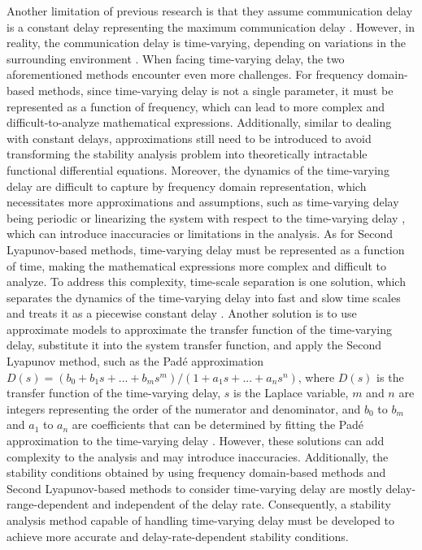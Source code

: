 \documentclass[journal]{IEEEtran}
\begin{document}
Another limitation of previous research is that they assume communication delay is a constant delay representing the maximum communication delay \citep{feyzmahdavian2012optimal,liu2001effects}. However, in reality, the communication delay is time-varying, depending on variations in the surrounding environment \citep{yang2021time,fiengo2019distributed}. When facing time-varying delay, the two aforementioned methods encounter even more challenges. For frequency domain-based methods, since time-varying delay is not a single parameter, it must be represented as a function of frequency, which can lead to more complex and difficult-to-analyze mathematical expressions. Additionally, similar to dealing with constant delays, approximations still need to be introduced to avoid transforming the stability analysis problem into theoretically intractable functional differential equations. Moreover, the dynamics of the time-varying delay are difficult to capture by frequency domain representation, which necessitates more approximations and assumptions, such as time-varying delay being periodic \citep{louarroudi2014frequency} or linearizing the system with respect to the time-varying delay \citep{otto2016frequency}, which can introduce inaccuracies or limitations in the analysis. As for Second Lyapunov-based methods, time-varying delay must be represented as a function of time, making the mathematical expressions more complex and difficult to analyze. To address this complexity, time-scale separation is one solution, which separates the dynamics of the time-varying delay into fast and slow time scales and treats it as a piecewise constant delay \citep{reiner1996flight}. Another solution is to use approximate models to approximate the transfer function of the time-varying delay, substitute it into the system transfer function, and apply the Second Lyapunov method, such as the Padé approximation $D(s) = (b_0 + b_1 s + ... + b_m s^m)/(1 + a_1 s + ... + a_n s^n)$, where $D(s)$ is the transfer function of the time-varying delay, $s$ is the Laplace variable, $m$ and $n$ are integers representing the order of the numerator and denominator, and $b_0$ to $b_m$ and $a_1$ to $a_n$ are coefficients that can be determined by fitting the Padé approximation to the time-varying delay \citep{shah2004modeling}. However, these solutions can add complexity to the analysis and may introduce inaccuracies. Additionally, the stability conditions obtained by using frequency domain-based methods and Second Lyapunov-based methods to consider time-varying delay are mostly delay-range-dependent and independent of the delay rate. Consequently, a stability analysis method capable of handling time-varying delay must be developed to achieve more accurate and delay-rate-dependent stability conditions.
\end{document}
